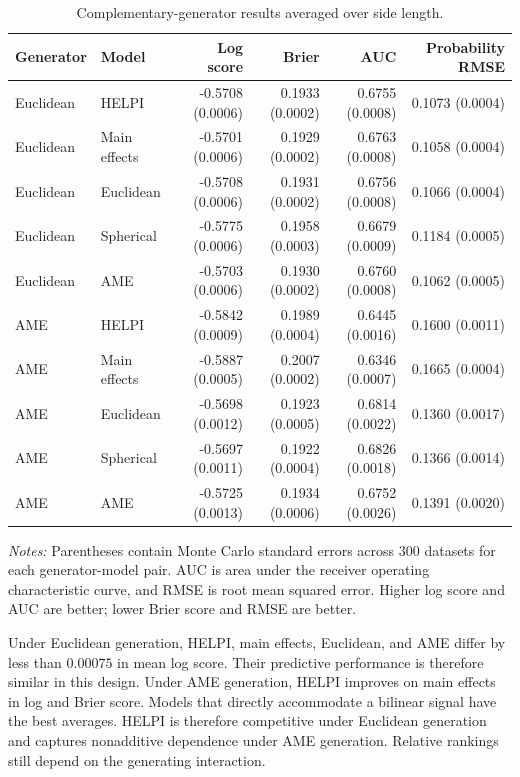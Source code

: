 \documentclass[
  12pt]{article}
\newcommand{\TableNote}[1]{%
  \par\vspace{0.35em}\noindent
  \begin{minipage}{0.96\linewidth}
    \footnotesize\setstretch{1.05}\raggedright
    \textit{Notes:} #1
  \end{minipage}%
  \par\vspace{0.6\baselineskip}%
}
\theoremstyle{definition}
\theoremstyle{plain}
\begin{document}
\begin{table}[H]
	\centering
	\scriptsize
	\caption{Complementary-generator results averaged over side length.}
	\label{tab:misspecification}
	\begin{tabular}{llrrrr}
		\toprule
		Generator & Model & Log score & Brier & AUC & Probability RMSE \\
		\midrule
		Euclidean & HELPI & -0.5708 (0.0006) & 0.1933 (0.0002) & 0.6755 (0.0008) & 0.1073 (0.0004) \\
		Euclidean & Main effects & -0.5701 (0.0006) & 0.1929 (0.0002) & 0.6763 (0.0008) & 0.1058 (0.0004) \\
		Euclidean & Euclidean & -0.5708 (0.0006) & 0.1931 (0.0002) & 0.6756 (0.0008) & 0.1066 (0.0004) \\
		Euclidean & Spherical & -0.5775 (0.0006) & 0.1958 (0.0003) & 0.6679 (0.0009) & 0.1184 (0.0005) \\
		Euclidean & AME & -0.5703 (0.0006) & 0.1930 (0.0002) & 0.6760 (0.0008) & 0.1062 (0.0005) \\
		\addlinespace
		AME & HELPI & -0.5842 (0.0009) & 0.1989 (0.0004) & 0.6445 (0.0016) & 0.1600 (0.0011) \\
		AME & Main effects & -0.5887 (0.0005) & 0.2007 (0.0002) & 0.6346 (0.0007) & 0.1665 (0.0004) \\
		AME & Euclidean & -0.5698 (0.0012) & 0.1923 (0.0005) & 0.6814 (0.0022) & 0.1360 (0.0017) \\
		AME & Spherical & -0.5697 (0.0011) & 0.1922 (0.0004) & 0.6826 (0.0018) & 0.1366 (0.0014) \\
		AME & AME & -0.5725 (0.0013) & 0.1934 (0.0006) & 0.6752 (0.0026) & 0.1391 (0.0020) \\
		\bottomrule
	\end{tabular}
	\TableNote{Parentheses contain Monte Carlo standard errors across 300 datasets for each generator-model pair. AUC is area under the receiver operating characteristic curve, and RMSE is root mean squared error. Higher log score and AUC are better; lower Brier score and RMSE are better.}
\end{table}

Under Euclidean generation, HELPI, main effects, Euclidean, and AME differ by less than $0.00075$ in mean log score. Their predictive performance is therefore similar in this design. Under AME generation, HELPI improves on main effects in log and Brier score. Models that directly accommodate a bilinear signal have the best averages. HELPI is therefore competitive under Euclidean generation and captures nonadditive dependence under AME generation. Relative rankings still depend on the generating interaction.
\end{document}
